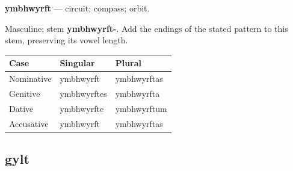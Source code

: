\par\begin{minipage}{\linewidth}\raggedright
\textbf{ymbhwyrft} — circuit; compass; orbit.

Masculine; stem \textbf{ymbhwyrft-}. Add the endings of the stated pattern to this stem, preserving its vowel length.

\par\begingroup
\fontsize{10.5}{13.2}\selectfont
\setlength{\LTleft}{0pt}\setlength{\LTright}{\fill}
\noindent
\begin{tabular}{@{}>{\raggedright\arraybackslash}p{36.99mm}>{\raggedright\arraybackslash}p{40.69mm}>{\raggedright\arraybackslash}p{40.69mm}@{}}
\toprule
\textbf{Case} & \textbf{Singular} & \textbf{Plural} \\
\midrule
Nominative & ymbhwyrft & ymbhwyrftas \\
Genitive & ymbhwyrftes & ymbhwyrfta \\
Dative & ymbhwyrfte & ymbhwyrftum \\
Accusative & ymbhwyrft & ymbhwyrftas \\
\bottomrule
\end{tabular}
\par\endgroup

\end{minipage}\par
{}
\subsection*{gylt}

